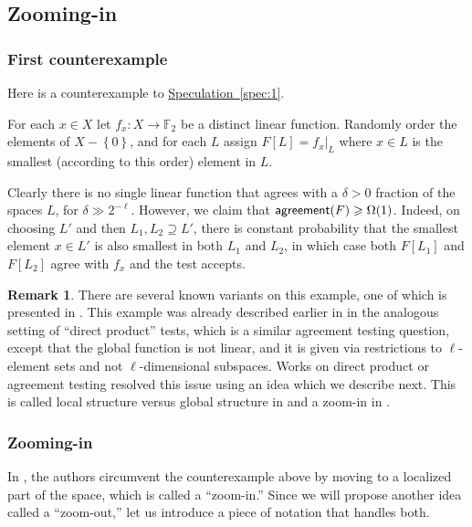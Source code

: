 \documentclass[11pt]{article}
\numberwithin{equation}{section}
\theoremstyle{definition}
\newtheorem{remark}[theorem]{Remark}
\theoremstyle{plain}
\newcommand{\expref}[2]{\hyperref[#2]{#1~\ref{#2}}}
\newcommand\set[1]{{\left\{ #1 \right\}}}
\renewcommand\ge{\geqslant}
\renewcommand\supset{\supseteq}
\def\F{\mathbb{F}}
\def\agr{{\sf agreement}}
\begin{document}
\subsection{Zooming-in}\label{sec:counter-1}
%
\subsubsection*{First counterexample}  %
Here is a counterexample to \expref{Speculation}{spec:1}.

%
For each $x\in X$ let $f_x:X\to\F_2$ be a distinct linear function. Randomly order the elements of $X-\set 0$, and for each $L$ assign $F[L] = f_x|_L$ where $x\in L$ is the smallest (according to this order) element in $L$.

Clearly there is no single linear function that agrees with
a %
$\delta>0$ fraction of the spaces $L$, for $\delta \gg 2^{-\ell}$. However, we claim that $\agr(F) \ge \Omega(1)$. Indeed, on choosing $L'$ and then $L_1,L_2\supset L'$, there is constant probability that the smallest element $x\in L'$ is also smallest in both $L_1$ and $L_2$, in which case both $F[L_1]$ and $F[L_2]$ agree with $f_x$ and the test accepts.

\begin{remark}
There are several known variants on this example, one of which is presented in \cite{KMS}. This example was already described earlier in  \cite{DG08} in the analogous setting of ``direct product'' tests, which is a similar agreement testing question, except that the global function is not linear, and it is given via restrictions to $\ell$-element sets and not $\ell$-dimensional subspaces. Works on direct product or agreement testing \cite{IKW,DS14} resolved this issue using an idea which we describe next. This is called local structure versus global structure in \cite {IKW,DS14} and a zoom-in in \cite{KMS}.
\end{remark}


\subsubsection*{Zooming-in}

In \cite{KMS}, the authors circumvent the counterexample above by
moving to a localized part of the space, which is called a
``zoom-in.'' Since we will propose another idea called a ``zoom-out,''
let us introduce a piece of notation that handles both.
\end{document}

